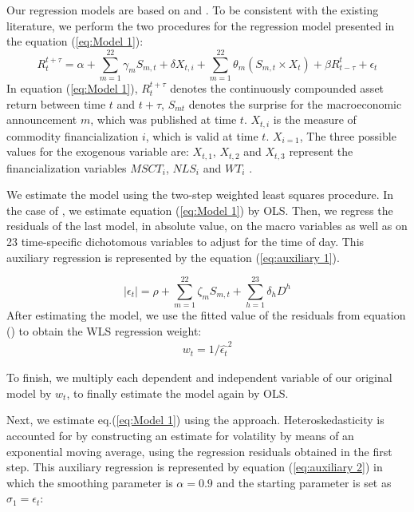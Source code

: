 \documentclass[12pt]{article}
\begin{document}
Our regression models are based on \citet{kurov2019price} and \citet{andersen2007real}. To be consistent with the existing literature, we perform the two procedures for the regression model presented in the equation (\ref{eq:Model 1}):
\begin{equation}\label{eq:Model 1}
R_{t}^{t+\tau}=\alpha+\sum_{m=1}^{22} \gamma_m S_{m,t}+ \delta X_{t,i} + \sum_{m=1}^{22} \theta_m (S_{m,t} \times X_t)+\beta R_{t-\tau}^{t}+\epsilon_{t} 
\end{equation}
In equation (\ref{eq:Model 1}), $R_{t}^{t+\tau}$ denotes the continuously compounded asset return between time $t$ and $t+\tau$, $S_{mt}$ denotes the surprise for the macroeconomic announcement $m$, which was published at time $t$. $X_{t,i}$ is the measure of commodity financialization $i$,  which is valid at time $t$. $X_{i = 1}$, The three possible values for the exogenous variable are:  $X_{t,1}$, $X_{t,2}$ and $X_{t,3}$ represent the financialization variables $MSCT_i$, $NLS_i$ and $WT_i$ . 

We estimate the model using the two-step weighted least squares procedure. In the case of \citet{andersen2007real}, we estimate equation (\ref{eq:Model 1}) by OLS. Then, we regress the residuals of the last model, in absolute value, on the macro variables as well as on 23 time-specific dichotomous variables to adjust for the time of day. This auxiliary regression is represented by the equation (\ref{eq:auxiliary 1}).

\begin{equation}\label{eq:auxiliary 1}
\mid \epsilon_{t} \mid=\rho+\sum_{m=1}^{22} \zeta_m S_{m,t}+\sum_{h=1}^{23} \delta_h D^h
\end{equation}
After estimating the model, we use the fitted value of the residuals from equation (\label{eq:auxiliary 1}) to obtain the WLS regression weight:
\begin{align*}
w_t=1/\hat{\epsilon_t}^2
\end{align*}

To finish, we multiply each dependent and independent variable of our original model by $w_t$, to finally estimate the model again by OLS.

Next, we estimate eq.(\ref{eq:Model 1}) using the \citet{kurov2019price} approach. Heteroskedasticity is accounted for by constructing an estimate for volatility by means of an exponential moving average, using the regression residuals obtained in the first step. This auxiliary regression is represented by equation (\ref{eq:auxiliary 2}) in which the smoothing parameter is $\alpha=0.9$ and the starting parameter is set as $\sigma_1=\epsilon_t$:
\end{document}
